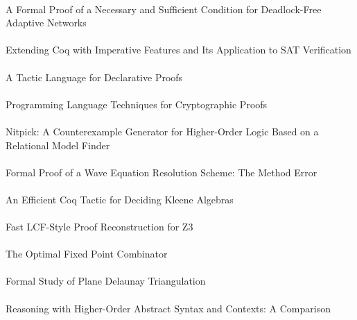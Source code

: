 \documentclass{article}
\begin{document}
\cite{10-verbeek-networks} \\
A Formal Proof of a Necessary and Sufficient Condition for Deadlock-Free Adaptive Networks \\

\cite{10-armand-imperative} \\
Extending {Coq} with Imperative Features and Its Application to {SAT} Verification \\

\cite{10-autexier-declarative} \\
A Tactic Language for Declarative Proofs \\

\cite{10-barthe-crypto} \\
Programming Language Techniques for Cryptographic Proofs \\

\cite{10-blanchette-nitpick} \\
{Nitpick:} A Counterexample Generator for Higher-Order Logic Based on a Relational Model Finder \\

\cite{10-boldo-wave} \\
Formal Proof of a Wave Equation Resolution Scheme: The Method Error \\

\cite{10-braibant-kleene} \\
An Efficient {Coq} Tactic for Deciding {Kleene} Algebras \\

\cite{10-boehme-z3} \\
Fast {LCF}-Style Proof Reconstruction for {Z3} \\

\cite{10-chargueraud-combinator} \\
The Optimal Fixed Point Combinator \\

\cite{10-dufourd-triangulation} \\
Formal Study of Plane {Delaunay} Triangulation \\

\cite{10-felty-hoas} \\
Reasoning with Higher-Order Abstract Syntax and Contexts: A Comparison \\
\end{document}

